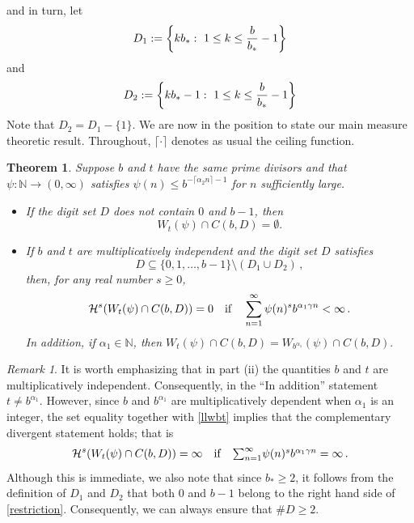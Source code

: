 \documentclass[12pt]{article}
\newtheorem{theorem}{Theorem}[section]
\theoremstyle{definition}
\theoremstyle{remark}
\newtheorem{remark}{{Remark}}[section]
\begin{document}
and in turn, let 
\begin{equation}\label{D_{1}}
 D_{1}:=\left\{kb_{*}:\  1\leq k\leq\frac{b}{b_{*}}-1 \right\}
\end{equation}
and
\begin{equation}\label{D_{2}}
D_{2}:=\left\{kb_{*}-1:\  1\leq k\leq\frac{b}{b_{*}}-1 \right\}
\end{equation}
Note that $D_{2}= D_{1}-\{1\}$. We are now  in the position to state our main measure theoretic result. Throughout, $\lceil\cdot\rceil$ denotes as usual  the ceiling function. 


\begin{theorem}\label{12sv}
Suppose $b$ and $t$  have the same prime divisors and  that $\psi:\mathbb{N}\to(0,\infty)$  satisfies $\psi(n)\le b^{-\lceil\alpha_{2}n\rceil-1}$  for $n$ sufficiently large.
\begin{itemize}
\item[(i)]  If the digit set  $D$ does not contain  $0$ and $b-1$, then
\begin{equation} \label{emptyre} W_{t}(\psi)\cap C(b,D)=\emptyset.
\end{equation}

    \item[(ii)]  If  $b$ and $t$ are multiplicatively independent and  the digit set    $D$  satisfies
\begin{equation}\label{restriction}
    D\subseteq\{0,1,\ldots,b-1\}\setminus(D_{1}\cup D_{2})   \, , 
\end{equation}
then,  for any real number $s\geq0$, 
\begin{equation*}
\mathcal{H}^{s}(W_{t}(\psi)\cap C(b,D))=  0 \quad  {\rm if}\quad  \sum\limits_{n=1}^{\infty} \psi(n)^{s}b^{\alpha_{1}\gamma n}<\infty  \, . 
\end{equation*}
In addition, if $\alpha_{1}\in\mathbb{N}$, then
$W_{t}(\psi)\cap C(b,D)=W_{b^{\alpha_{1}}}(\psi)\cap C(b,D).$

\end{itemize}
\end{theorem}
 
 \bigskip 

\begin{remark}
It is worth emphasizing that in part (ii) the quantities 
$b$ and $t$ are multiplicatively independent. Consequently, in the “In addition” statement $ t\neq b^{\alpha_{1}}$.  However, since $b$ and $b^{\alpha_{1}}$ are multiplicatively dependent  when $\alpha_1$ is an integer, the set equality together with  \eqref{llwbt} implies that the  complementary divergent statement holds;  that is 
$$
\mathcal{H}^{s}(W_{t}(\psi)\cap C(b,D))=  \infty  \quad  {\rm if}\quad  \textstyle{\sum_{n=1}^{\infty} } \psi(n)^{s}b^{\alpha_{1}\gamma n} = \infty  \, . 
$$
Although this is immediate, we also note that since
 $b_{*}\geq2$, it follows from the definition of $D_{1}$ and $D_{2}$ that both $0$ and $b-1$  belong to the right hand side of \eqref{restriction}. Consequently, we can always ensure that  $\#D\geq2$. 
\end{remark}
\end{document}
